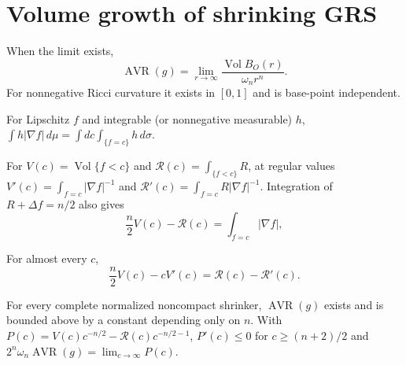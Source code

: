 \section{Volume growth of shrinking GRS}

\begin{definition}
\label{def:chow-iv-avr}
When the limit exists,
\[
\operatorname{AVR}(g)=\lim_{r\to\infty}
\frac{\operatorname{Vol}B_O(r)}{\omega_nr^n}.
\]
For nonnegative Ricci curvature it exists in $[0,1]$ and is base-point
independent.
\end{definition}

\begin{proposition}
\label{prop:chow-iv-coarea}
For Lipschitz $f$ and integrable (or nonnegative measurable) $h$,
$\int h|\nabla f|\,d\mu=\int dc\int_{\{f=c\}}h\,d\sigma$.
\end{proposition}

\begin{lemma}
\label{lem:chow-iv-sublevel-derivatives}
For $V(c)=\operatorname{Vol}\{f<c\}$ and $\mathcal R(c)=\int_{\{f<c\}}R$,
at regular values $V'(c)=\int_{f=c}|\nabla f|^{-1}$ and
$\mathcal R'(c)=\int_{f=c}R|\nabla f|^{-1}$.  Integration of
$R+\Delta f=n/2$ also gives
\[
\frac n2V(c)-\mathcal R(c)=\int_{f=c}|\nabla f|,
\]
\end{lemma}

\begin{lemma}
\label{lem:chow-iv-sublevel-differential-identity}
For almost every $c$,
\[
\frac n2V(c)-cV'(c)=\mathcal R(c)-\mathcal R'(c).
\]
\end{lemma}

\begin{theorem}
\label{thm:chow-iv-avr-exists}
For every complete normalized noncompact shrinker, $\operatorname{AVR}(g)$ exists
and is bounded above by a constant depending only on $n$.  With
$P(c)=V(c)c^{-n/2}-\mathcal R(c)c^{-n/2-1}$,
$P'(c)\le0$ for $c\ge(n+2)/2$ and
$2^n\omega_n\operatorname{AVR}(g)=\lim_{c\to\infty}P(c)$.
\end{theorem}

